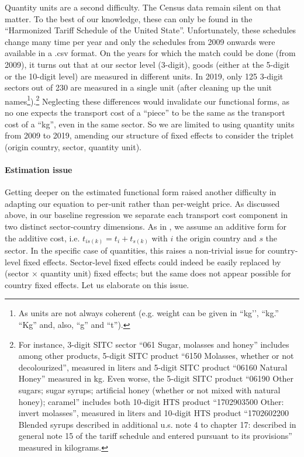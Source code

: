 \documentclass[11pt,twoside, authoryear]{elsarticle}
\begin{document}
Quantity units are a second difficulty. The Census data remain silent on that matter. To the best of our knowledge, these can only be found in the ``Harmonized Tariff Schedule of the United State''. Unfortunately, these schedules change many time per year and only the schedules from 2009 onwards were available in a .csv format. On the years for which the match could be done (from 2009), it turns out that at our sector level (3-digit), goods (either at the 5-digit or the 10-digit level) are measured in different units. In 2019, only 125 3-digit sectors out of 230 are measured in a single unit (after cleaning up the unit names\footnote{As units are not always coherent (e.g. weight can be given in ``kg’’, ``kg.'' ``Kg'' and, also, ``g'' and ``t'').}).\footnote{For instance, 3-digit SITC sector ``061 Sugar, molasses and honey'' includes among other products, 5-digit SITC product ``6150 Molasses, whether or not decolourized'', measured in liters and 5-digit SITC product ``06160 Natural Honey'' measured in kg. Even worse, the 5-digit SITC product ``06190 Other sugars; sugar syrups; artificial honey (whether or not mixed with natural honey); caramel'' includes both 10-digit HTS product ``1702903500 Other: invert molasses'', measured in liters and 10-digit HTS product ``1702602200 Blended syrups described in additional u.s. note 4 to chapter 17: described in general note 15 of the tariff schedule and entered pursuant to its provisions''  measured in kilograms.} Neglecting these differences would invalidate our functional forms, as no one expects the transport cost of a ``piece'' to be the same as the transport cost of a ``kg'', even in the same sector.
So we are limited to using quantity units from 2009 to 2019, amending our structure of fixed effects to consider the triplet (origin country, sector, quantity unit).\medskip

\paragraph{Estimation issue} Getting deeper on the estimated functional form raised another difficulty in adapting our equation to per-unit rather than per-weight price. As discussed above, in our baseline regression we separate each transport cost component in two distinct sector-country dimensions. As in \cite{Irrazabal_2015}, we assume an additive form for the additive cost, i.e. $t_{is(k)} = t_i+t_{s(k)}$ with $i$ the origin country and $s$ the sector. In the specific case of quantities, this raises a non-trivial issue for country-level fixed effects. Sector-level fixed effects could indeed be easily replaced by (sector $\times$ quantity unit) fixed effects; but the same does not appear possible for country fixed effects. Let us elaborate on this issue.
\end{document}
